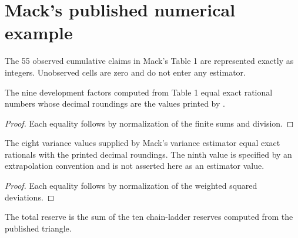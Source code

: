 \chapter{Mack's published numerical example}

\begin{definition}\label{def:taylorAshe}\leanok
The 55 observed cumulative claims in Mack's Table 1 are represented exactly as
integers. Unobserved cells are zero and do not enter any estimator.
\end{definition}

\begin{theorem}\label{thm:taylorAsheFhat}\leanok
{}
The nine development factors computed from Table 1 equal exact rational
numbers whose decimal roundings are the values printed by \cite{Mack1993}.
\end{theorem}
\begin{proof}\leanok Each equality follows by normalization of the finite sums and division. \end{proof}

\begin{theorem}\label{thm:taylorAsheSigma2}\leanok
{}
The eight variance values supplied by Mack's variance estimator equal exact
rationals with the printed decimal roundings. The ninth value is specified by
an extrapolation convention and is not asserted here as an estimator value.
\end{theorem}
\begin{proof}\leanok Each equality follows by normalization of the weighted squared deviations. \end{proof}

\begin{definition}\label{def:taylorAsheTotalReserve}\leanok
{}
The total reserve is the sum of the ten chain-ladder reserves computed from
the published triangle.
\end{definition}

